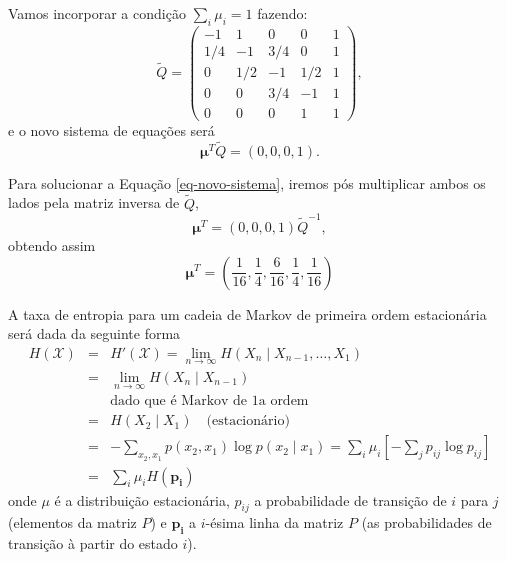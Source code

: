 \begin{frame}[allowframebreaks]
\framebreak

Vamos incorporar a condição $\sum_i \mu_i = 1$ fazendo:
\begin{equation}
\tilde{Q} = \begin{pmatrix} 
-1  &  1  & 0   & 0   & 1 \\
1/4 & -1  & 3/4 & 0   & 1 \\
0   & 1/2 & -1  & 1/2 & 1 \\
0   & 0   & 3/4 & -1  & 1 \\
0   & 0   & 0   & 1   & 1
\end{pmatrix} ,
\end{equation}
e o novo sistema de equações será
\begin{equation}
\mathbf{\mu}^T \tilde{Q} = (0, 0, 0, 1) .
\label{eq-novo-sistema}
\end{equation}


\framebreak
Para solucionar a Equação \ref{eq-novo-sistema}, iremos pós multiplicar ambos os lados
pela matriz inversa de $\tilde{Q}$,
\begin{equation}
\mathbf{\mu}^T = (0, 0, 0, 1) \tilde{Q}^{-1} ,
\end{equation}
obtendo assim 
\begin{equation}
\mathbf{\mu}^T = \left( \frac{1}{16}, \frac{1}{4}, \frac{6}{16}, \frac{1}{4}, \frac{1}{16} \right)
\end{equation}


\framebreak

A taxa de entropia para um cadeia de Markov de primeira ordem
estacionária será dada da seguinte forma
  \begin{eqnarray}
  H(\mathcal{X}) &=& H'(\mathcal{X}) = \lim_{n \rightarrow \infty} H(X_n \mid X_{n-1}, \ldots, X_1) \nonumber \\
        &=& \lim_{n \rightarrow \infty} H(X_n \mid X_{n-1}) \nonumber \\
        && \text{dado que é Markov de 1a ordem} \nonumber \\
        &=& H(X_2 \mid X_1) \quad \text{(estacionário)} \nonumber \\
        &=& - \sum_{x_2, x_1} p(x_2, x_1) \log p(x_2 \mid x_1) = \sum_i \mu_i \left[ - \sum_j p_{ij} \log p_{ij} \right] \nonumber \\
        &=& \sum_i \mu_i H( \mathbf{p_i} )
  \end{eqnarray}
onde $\mu$ é a distribuição estacionária,
$p_{ij}$ a probabilidade de transição de $i$ para $j$ (elementos da matriz $P$)
e $\mathbf{p_i}$ a $i$-ésima linha da matriz $P$ (as probabilidades de transição à partir
do estado $i$).


\end{frame}

